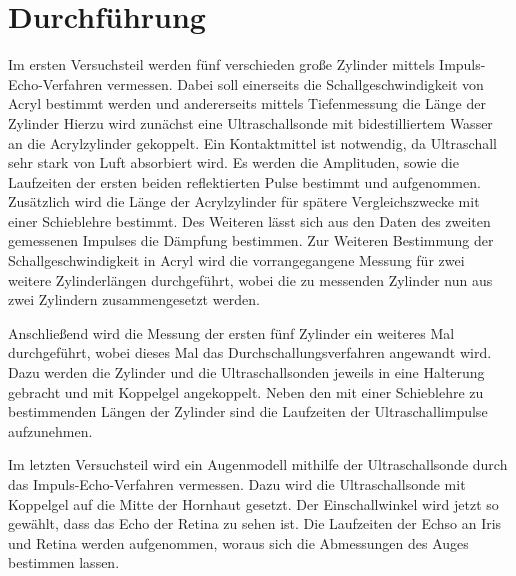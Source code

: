 \section{Durchführung}
\label{sec:Durchführung}
Im ersten Versuchsteil werden fünf verschieden große 
Zylinder mittels Impuls-Echo-Verfahren vermessen.
Dabei soll einerseits die Schallgeschwindigkeit von Acryl 
bestimmt werden und andererseits mittels Tiefenmessung die 
Länge der Zylinder
Hierzu wird zunächst eine Ultraschallsonde mit bidestilliertem 
Wasser an die Acrylzylinder gekoppelt. Ein Kontaktmittel ist
notwendig, da Ultraschall sehr stark von Luft absorbiert wird.
Es werden die Amplituden, sowie die Laufzeiten der ersten
beiden reflektierten Pulse bestimmt und aufgenommen.
Zusätzlich wird die Länge der Acrylzylinder für spätere Vergleichszwecke mit einer Schieblehre 
bestimmt. 
Des Weiteren lässt sich aus den Daten des zweiten gemessenen
Impulses die Dämpfung bestimmen.
Zur Weiteren Bestimmung der Schallgeschwindigkeit in Acryl
wird die vorrangegangene Messung für zwei weitere Zylinderlängen
durchgeführt, wobei die zu messenden Zylinder nun aus 
zwei Zylindern zusammengesetzt werden. 


Anschließend wird die Messung der ersten fünf Zylinder 
ein weiteres Mal durchgeführt, wobei dieses Mal das 
Durchschallungsverfahren angewandt wird. Dazu werden die 
Zylinder und die Ultraschallsonden jeweils in eine Halterung
gebracht und mit Koppelgel angekoppelt. Neben den mit einer
Schieblehre zu bestimmenden Längen der Zylinder sind die Laufzeiten 
der Ultraschallimpulse aufzunehmen.


Im letzten Versuchsteil wird ein Augenmodell mithilfe der Ultraschallsonde
durch das Impuls-Echo-Verfahren vermessen. Dazu wird 
die Ultraschallsonde mit Koppelgel auf die Mitte der Hornhaut
gesetzt. Der Einschallwinkel wird jetzt so gewählt, dass 
das Echo der Retina zu sehen ist. Die Laufzeiten der Echso
an Iris und Retina werden aufgenommen, woraus sich die Abmessungen 
des Auges bestimmen lassen.

